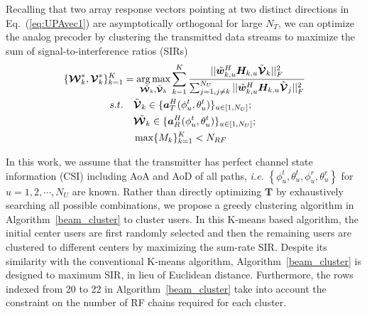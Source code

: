 \documentclass[conference]{IEEEtran}
\def\argmax{\mathop{\mbox{arg\,max}}}
\begin{document}
{Recalling that two array response vectors pointing at two distinct directions in Eq.~(\ref{eq:UPAvec1}) are asymptotically orthogonal for large $N_T$, we can optimize the analog precoder by clustering the transmitted data streams to maximize the sum of signal-to-interference ratios (SIRs)
\begin{align}\label{eq:group-scheduling}
\{\bm{\mathcal{W}}^*_k, \bm{\mathcal{V}}^*_k\}_{k=1}^{K} &= \argmax_{\tilde{\bm{\mathcal{W}}_k},\tilde{\bm{\mathcal{V}}}_k} \sum_{k=1}^{K}\frac{||\tilde{\bm{w}}^H_{k,u} \bm{H}_{k,u} \tilde{\bm{\mathcal{V}}}_k||_F^2}{\sum_{j=1,j\neq k}^{N_U}||\tilde{\bm{w}}^H_{k,u} \bm{H}_{k,u} \tilde{\bm{\mathcal{V}}}_j||_F^2}  \\ \nonumber
s.t. &\quad \tilde{\bm{\mathcal{V}}}_{k} \in  \{\bm{a}^H_{T}(\phi^t_{u},\theta^t_{u})\}_{u\in [1,N_U]}; \\
&\quad \tilde{\bm{\mathcal{W}}_k} \in \{\bm{a}^H_{R}(\phi^t_{u},\theta^t_{u})\}_{u\in [1,N_U]};\nonumber\\
&\quad \max\{M_k\}_{k=1}^K<N_{RF}\nonumber
\end{align}

In this work, we assume that the transmitter has perfect channel state information (CSI) including AoA and AoD of all paths, {\em i.e.} $\left\{\phi^t_u,\theta^t_u,\phi^r_u,\theta^r_u\right\}$ for $u=1,2,\cdots,N_U$ are known. Rather than directly optimizing $\bm{T}$ by exhaustively searching all possible combinations, we propose a greedy clustering algorithm in Algorithm~\ref{beam_cluster} to cluster users. In this K-means based algorithm, the initial center users are first randomly selected and then the remaining users are clustered to different centers by maximizing the sum-rate SIR. Despite its similarity with the conventional K-means algorithm, Algorithm~\ref{beam_cluster} is designed to maximum SIR, in lieu of Euclidean distance. Furthermore, the rows indexed from 20 to 22 in Algorithm~\ref{beam_cluster} take into account the constraint on the number of RF chains required for each cluster.

}
\end{document}
